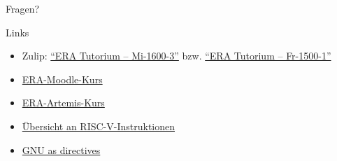 \documentclass[
  german,            %
  aspectratio=169,    %
]{tumbeamer}
\begin{document}
\begin{frame}[c]{}{}
	\begin{center}
		\LARGE Fragen?
	\end{center}
\end{frame}


\begin{frame}[c, fragile]{Links}{}
	\begin{itemize}
		\item Zulip: \href{https://zulip.in.tum.de/#narrow/channel/3255-ERA-Tutorium-.E2.80.93-Mi-1600-3}{\enquote{ERA Tutorium -- Mi-1600-3}}
		      bzw. \href{https://zulip.in.tum.de/#narrow/channel/3264-ERA-Tutorium-.E2.80.93-Fr-1500-1}{\enquote{ERA Tutorium -- Fr-1500-1}}
		\item \href{https://www.moodle.tum.de/course/view.php?id=111440}{ERA-Moodle-Kurs}
		\item \href{https://artemis.tum.de/courses/516}{ERA-Artemis-Kurs}
		\item \href{https://msyksphinz-self.github.io/riscv-isadoc/html/index.html}{Übersicht an RISC-V-Instruktionen}
		\item \href{https://ftp.gnu.org/old-gnu/Manuals/gas/html_chapter/as_7.html}{GNU as directives}
	\end{itemize}
\end{frame}

\maketitle
\end{document}
